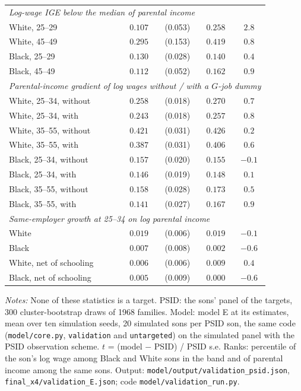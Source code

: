 \begin{table}[!htbp]
{\begin{tabular}{lcccc}
\multicolumn{5}{l}{\textit{Log-wage IGE below the median of parental income}} \\
\quad White, 25--29 & $0.107$ & (0.053) & $0.258$ & $2.8$ \\
\quad White, 45--49 & $0.295$ & (0.153) & $0.419$ & $0.8$ \\
\quad Black, 25--29 & $0.130$ & (0.028) & $0.140$ & $0.4$ \\
\quad Black, 45--49 & $0.112$ & (0.052) & $0.162$ & $0.9$ \\
\multicolumn{5}{l}{\textit{Parental-income gradient of log wages without / with a $G$-job dummy}} \\
\quad White, 25--34, without & $0.258$ & (0.018) & $0.270$ & $0.7$ \\
\quad White, 25--34, with & $0.243$ & (0.018) & $0.257$ & $0.8$ \\
\quad White, 35--55, without & $0.421$ & (0.031) & $0.426$ & $0.2$ \\
\quad White, 35--55, with & $0.387$ & (0.031) & $0.406$ & $0.6$ \\
\quad Black, 25--34, without & $0.157$ & (0.020) & $0.155$ & $-0.1$ \\
\quad Black, 25--34, with & $0.146$ & (0.019) & $0.148$ & $0.1$ \\
\quad Black, 35--55, without & $0.158$ & (0.028) & $0.173$ & $0.5$ \\
\quad Black, 35--55, with & $0.141$ & (0.027) & $0.167$ & $0.9$ \\
\multicolumn{5}{l}{\textit{Same-employer growth at 25--34 on log parental income}} \\
\quad White & $0.019$ & (0.006) & $0.019$ & $-0.1$ \\
\quad Black & $0.007$ & (0.008) & $0.002$ & $-0.6$ \\
\quad White, net of schooling & $0.006$ & (0.006) & $0.009$ & $0.4$ \\
\quad Black, net of schooling & $0.005$ & (0.009) & $0.000$ & $-0.6$ \\
\bottomrule
\end{tabular}}
\par\smallskip
\begin{minipage}{\textwidth}\footnotesize \textit{Notes:} None of these statistics is a target. PSID: the sons' panel of the targets, 300 cluster-bootstrap draws of 1968 families. Model: model E at its estimates, mean over ten simulation seeds, 20 simulated sons per PSID son, the same code (\texttt{model/core.py}, \texttt{validation} and \texttt{untargeted}) on the simulated panel with the PSID observation scheme. $t$ = (model $-$ PSID) / PSID s.e. Ranks: percentile of the son's log wage among Black and White sons in the band and of parental income among the same sons. Output: \texttt{model/output/validation\_psid.json}, \texttt{final\_x4/validation\_E.json}; code \texttt{model/validation\_run.py}.\end{minipage}
\end{table}
